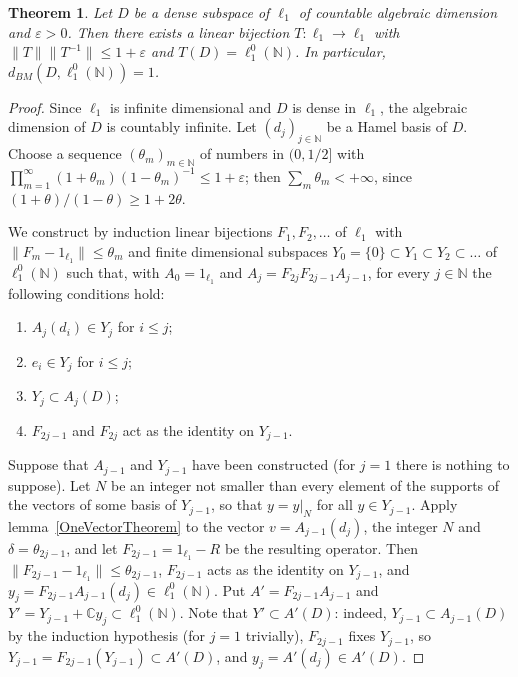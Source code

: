 \documentclass[12pt]{article}
\newtheorem{theorem}{Theorem}[section]
\newcommand{\lo}[1]{\ell_1^0(#1)}
\newcommand{\norm}[1]{\lVert #1\rVert}
\newcommand{\BM}{d_{BM}}
\begin{document}
\begin{theorem}\label{BackAndForth} Let $D$ be a dense subspace of $\ell_1$ of
    countable algebraic dimension and $\varepsilon>0$. Then there exists a
    linear bijection $T:\ell_1\to\ell_1$ with
    $\norm{T}\norm{T^{-1}}\leq 1+\varepsilon$ and $T(D)=\lo{\mathbb{N}}$. In
    particular, $\BM(D,\lo{\mathbb{N}})=1$.
\end{theorem}
\begin{proof} Since $\ell_1$ is infinite dimensional and $D$ is dense in
    $\ell_1$, the algebraic dimension of $D$ is countably infinite. Let
    ${(d_j)}_{j\in\mathbb{N}}$ be a Hamel basis of $D$. Choose a sequence
    ${(\theta_m)}_{m\in\mathbb{N}}$ of numbers in $(0,1/2]$ with
    $\prod_{m=1}^\infty(1+\theta_m){(1-\theta_m)}^{-1}\leq 1+\varepsilon$;
    then $\sum_m\theta_m<+\infty$, since $(1+\theta)/(1-\theta)\geq 1+2\theta$.

    We construct by induction linear bijections $F_1,F_2,\ldots$ of $\ell_1$
    with $\norm{F_m-1_{\ell_1}}\leq\theta_m$ and finite dimensional subspaces
    $Y_0=\{0\}\subset Y_1\subset Y_2\subset\ldots$ of $\lo{\mathbb{N}}$ such
    that, with $A_0=1_{\ell_1}$ and $A_j=F_{2j}F_{2j-1}A_{j-1}$, for every
    $j\in\mathbb{N}$ the following conditions hold:
    \begin{enumerate}[label = (\alph*)]
        \item $A_j(d_i)\in Y_j$ for $i\leq j$;
        \item $e_i\in Y_j$ for $i\leq j$;
        \item $Y_j\subset A_j(D)$;
        \item $F_{2j-1}$ and $F_{2j}$ act as the identity on $Y_{j-1}$.
    \end{enumerate}
    Suppose that $A_{j-1}$ and $Y_{j-1}$ have been constructed (for $j=1$
    there is nothing to suppose). Let $N$ be an integer not smaller than every
    element of the supports of the vectors of some basis of $Y_{j-1}$, so that
    $y=y|_N$ for all $y\in Y_{j-1}$. Apply lemma~\ref{OneVectorTheorem} to
    the vector $v=A_{j-1}(d_j)$, the integer $N$ and $\delta=\theta_{2j-1}$,
    and let $F_{2j-1}=1_{\ell_1}-R$ be the resulting operator. Then
    $\norm{F_{2j-1}-1_{\ell_1}}\leq\theta_{2j-1}$, $F_{2j-1}$ acts as the
    identity on $Y_{j-1}$, and $y_j=F_{2j-1}A_{j-1}(d_j)\in\lo{\mathbb{N}}$.
    Put $A'=F_{2j-1}A_{j-1}$ and $Y'=Y_{j-1}+\mathbb{C}y_j\subset\lo{\mathbb{N}}$.
    Note that $Y'\subset A'(D)$: indeed, $Y_{j-1}\subset A_{j-1}(D)$ by the
    induction hypothesis (for $j=1$ trivially), $F_{2j-1}$ fixes $Y_{j-1}$, so
    $Y_{j-1}=F_{2j-1}(Y_{j-1})\subset A'(D)$, and $y_j=A'(d_j)\in A'(D)$.


\end{proof}
\end{document}

